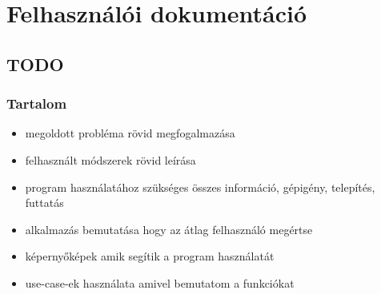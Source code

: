 \chapter{Felhasználói dokumentáció} %
\label{ch:user}

\section{TODO}
\subsection{Tartalom}
\begin{itemize}
    \item megoldott probléma rövid megfogalmazása
	\item felhasznált módszerek rövid leírása
	\item program használatához szükséges összes információ, gépigény, telepítés, futtatás
	\item alkalmazás bemutatása hogy az átlag felhasználó megértse
	\item képernyőképek amik segítik a program használatát
	\item use-case-ek használata amivel bemutatom a funkciókat
\end{itemize}

